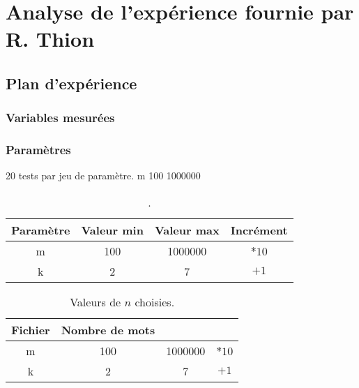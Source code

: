 
\section{Analyse de l'expérience fournie par R. Thion}


\subsection{Plan d'expérience}

\subsubsection{Variables mesurées}
\subsubsection{Paramètres}
20 tests par jeu de paramètre.
m 100 1000000

\begin{table}[h!]
	\centering
	\caption{.}
	\label{tab:table1}
	\begin{tabular}{c|ccc}
		\toprule
		Paramètre & Valeur min & Valeur max & Incrément\\
		\midrule
		m & 100 & 1000000 & $*10$\\
		k & 2 & 7 & $+1$\\
		\bottomrule
	\end{tabular}
\end{table}

\begin{table}[h!]
	\centering
	\caption{Valeurs de $n$ choisies.}
	\label{tab:table1}
	\begin{tabular}{c|ccc}
		\toprule
		Fichier & Nombre de mots\\
		\midrule
		m & 100 & 1000000 & $*10$\\
		k & 2 & 7 & $+1$\\
		\bottomrule
	\end{tabular}
\end{table}


